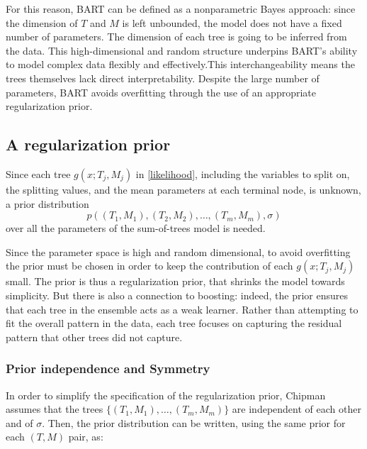 \documentclass[a4paper,11pt]{article}
\begin{document}
For this reason, BART can be defined as a nonparametric Bayes approach: since the dimension of $T$ and $M$ is left unbounded, the model does not have a fixed number of parameters. The dimension of each tree is going to be inferred from the data. This high-dimensional and random structure underpins BART's ability to model complex data flexibly and effectively.This interchangeability means the trees themselves lack direct interpretability. Despite the large number of parameters, BART avoids overfitting through the use of an appropriate regularization prior.

\subsection{A regularization prior}

Since each tree \( g(x; T_j, M_j) \) in \eqref{likelihood}, including the variables to split on, the splitting values, and the mean parameters at each terminal node, is unknown, a prior distribution 
\[
p((T_1, M_1), (T_2, M_2), \ldots, (T_m, M_m), \sigma)
\]
over all the parameters of the sum-of-trees model is needed. 

Since the parameter space is high and random dimensional, to avoid overfitting the prior must be chosen in order to keep the contribution of each \(g(x; T_j, M_j)\) small. The prior is thus a regularization prior, that shrinks the model towards simplicity. But there is also a connection to boosting: indeed, the prior ensures that each tree in the ensemble acts as a weak learner. Rather than attempting to fit the overall pattern in the data, each tree focuses on capturing the residual pattern that other trees did not capture. 

\subsubsection{Prior independence and Symmetry}
In order to simplify the specification of the regularization prior, Chipman assumes that  the trees \( \{(T_1, M_1), \ldots, (T_m, M_m)\} \) are independent of each other and of  \( \sigma \). Then, the prior distribution can be written, using the same prior for each $(T, M)$ pair, as:
\end{document}

